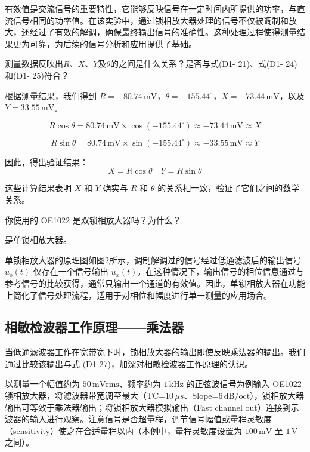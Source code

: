 \documentclass[dvipsnames, svgnames,a4paper,11pt]{article}
\begin{document}
有效值是交流信号的重要特性，它能够反映信号在一定时间内所提供的功率，与直流信号相同的功率值。在该实验中，通过锁相放大器处理的信号不仅被调制和放大，还经过了有效的解调，确保最终输出信号的准确性。这种处理过程使得测量结果更为可靠，为后续的信号分析和应用提供了基础。
\begin{question}
	测量数据反映出$R$、$X$、$Y$及$\theta$的之间是什么关系？是否与式(D1- 21)、式(D1- 24)和(D1- 25)符合？
\end{question}
根据测量结果，我们得到 \( R = +80.74 \, \text{mV} \)，\( \theta = -155.44^\circ \)，\( X = -73.44 \, \text{mV} \)，以及 \( Y = 33.55 \, \text{mV} \)。


\[
R \cos \theta = 80.74 \, \text{mV} \times \cos(-155.44^\circ) \approx -73.44 \, \text{mV} \approx X
\]


\[
R \sin \theta = 80.74 \, \text{mV} \times \sin(-155.44^\circ) \approx -33.55 \, \text{mV} \approx Y
\]

因此，得出验证结果：
\[
X = R \cos \theta \quad Y = R \sin \theta
\]

这些计算结果表明 \( X \) 和 \( Y \) 确实与 \( R \) 和 \( \theta \) 的关系相一致，验证了它们之间的数学关系。

\begin{question}
	你使用的 OE1022 是双锁相放大器吗？为什么？
\end{question}
是单锁相放大器。

单锁相放大器的原理图如图2所示，调制解调过的信号经过低通滤波后的输出信号 \( u_o(t) \) 仅存在一个信号输出 \( u_x(t) \)。在这种情况下，输出信号的相位信息通过与参考信号的比较获得，通常只输出一个通道的有效值。因此，单锁相放大器在功能上简化了信号处理流程，适用于对相位和幅度进行单一测量的应用场合。

\subsection{相敏检波器工作原理——乘法器}

当低通滤波器工作在宽带宽下时，锁相放大器的输出即使反映乘法器的输出。我们通过比较该输出与式 (D1-27)，加深对相敏检波器工作原理的认识。

以测量一个幅值约为 $50 \, \text{mVrms}$、频率约为 $1 \, \text{kHz}$ 的正弦波信号为例输入 OE1022 锁相放大器，将滤波器带宽调至最大（TC=$10 \, \mu s$、Slope=$6 \, \text{dB/oct}$），锁相放大器输出可等效于乘法器输出；将锁相放大器模拟输出（Fast channel out）连接到示波器的输入进行观察。注意信号是否超量程，调节信号幅值或量程灵敏度（sensitivity）使之在合适量程以内（本例中，量程灵敏度设置为 $100 \, \text{mV}$ 至 $1 \, \text{V}$ 之间）。
\end{document}
